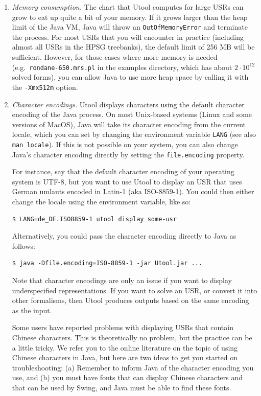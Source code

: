 \begin{enumerate}
\item \textit{Memory consumption.} The chart that Utool computes for
large USRs can grow to eat up quite a bit of your memory. If it grows
larger than the heap limit of the Java VM, Java will throw an
\verb?OutOfMemoryError? and terminate the process. For most USRs that
you will encounter in practice (including almost all USRs in the HPSG
treebanks), the default limit of 256 MB will be sufficient. However,
for those cases where more memory is needed (e.g.\
\verb?rondane-650.mrs.pl? in the examples directory, which has about
$2 \cdot 10^{12}$ solved forms), you can allow Java to use more heap
space by calling it with the \verb?-Xmx512m? option.

\item \textit{Character encodings.} Utool displays characters using the default
character encoding of the Java process. On most Unix-based systems (Linux and some versions of MacOS), Java will take its character encoding from the current locale, which you can set by changing the environment variable \verb?LANG? (see also \verb?man locale?). If this is not possible on your system, you can also change Java's character encoding directly by setting the \verb?file.encoding? property.

For instance, say that the default character encoding of your operating system is UTF-8, but you want to use Utool to display an USR that uses German umlauts encoded in Latin-1 (aka ISO-8859-1). You could then either change the locale using the environment variable, like so:

\begin{verbatim}
$ LANG=de_DE.ISO8859-1 utool display some-usr
\end{verbatim}

Alternatively, you could pass the character encoding directly to Java as follows:

\begin{verbatim}
$ java -Dfile.encoding=ISO-8859-1 -jar Utool.jar ...
\end{verbatim}

Note that character encodings are only an issue if you want to display
underspecified representations. If you want to solve an USR, or convert it
into other formalisms, then Utool produces outputs based on the same encoding as
the input.

Some users have reported problems with displaying USRs that contain Chinese characters. This is theoretically no problem, but the practice can be a little tricky. We refer you to the online literature on the topic of using Chinese characters in Java, but here are two ideas to get you started on troubleshooting: (a) Remember to inform Java of the character encoding you use, and (b) you must have fonts that can display Chinese characters and that can be used by Swing, and Java must be able to find these fonts.



\end{enumerate}

